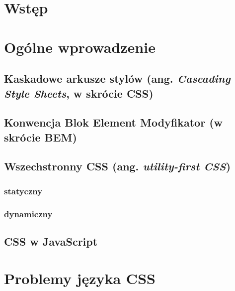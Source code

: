 \documentclass[a4paper,12pt]{book} %
\begin{document}
\sloppy



\thispagestyle{empty}


\newpage{}

\thispagestyle{empty}

\newpage{}



\tableofcontents{}






\chapter*{Wstęp}

\chapter{Ogólne wprowadzenie}
\section{Kaskadowe arkusze stylów (ang. \emph{Cascading Style Sheets}, w skrócie CSS)}
\section{Konwencja Blok Element Modyfikator (w skrócie BEM)}
\section{Wszechstronny CSS (ang. \emph{utility-first CSS})}
\subsection{statyczny}
\subsection{dynamiczny}

\section{CSS w JavaScript}

\chapter{Problemy języka CSS}
\end{document}
